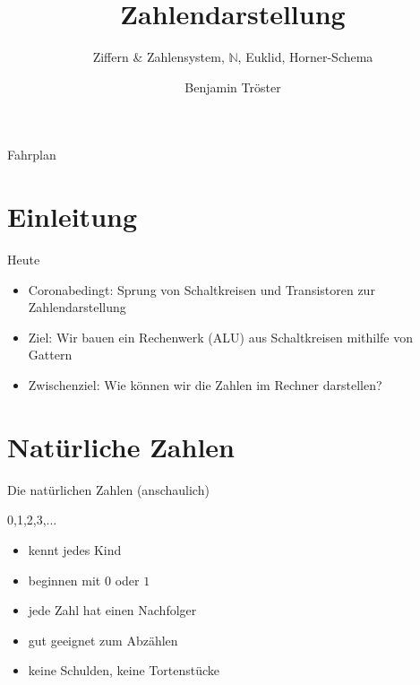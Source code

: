 \documentclass[12pt%
,aspectratio=169%
]{beamer}
\author{Benjamin Tröster}
\title[Zahlendarstellung]{Zahlendarstellung}
\subtitle[Ziffern \& Zahlensystem, $\mathbb{N}$, Euklid, Horner-Schema]{Ziffern \& Zahlensystem, $\mathbb{N}$, Euklid, Horner-Schema}
\institute[HTW Berlin]{Hochschule für Technik und Wirtschaft Berlin}
\begin{document}
\begin{frame}
\titlepage
\end{frame}

\begin{frame}{Fahrplan}
\tableofcontents[hideothersubsections]
\end{frame}

\section{Einleitung}
\begin{frame}{Heute}
\begin{itemize}
	\item Coronabedingt: Sprung von Schaltkreisen und Transistoren zur Zahlendarstellung
	\item Ziel: Wir bauen ein Rechenwerk (ALU) aus Schaltkreisen mithilfe von Gattern
	\item Zwischenziel: Wie können wir die Zahlen im Rechner darstellen?
\end{itemize}
\end{frame}

\section{Natürliche Zahlen}
\begin{frame}{Die natürlichen Zahlen (anschaulich)}
\begin{center}
\Huge{0,1,2,3,...}
\end{center}
\begin{itemize}
	\item kennt jedes Kind
	\item beginnen mit $0$ oder $1$
	\item jede Zahl hat einen Nachfolger
	\item gut geeignet zum Abzählen
	\item keine Schulden, keine Tortenstücke
\end{itemize}
\end{frame}
\end{document}
